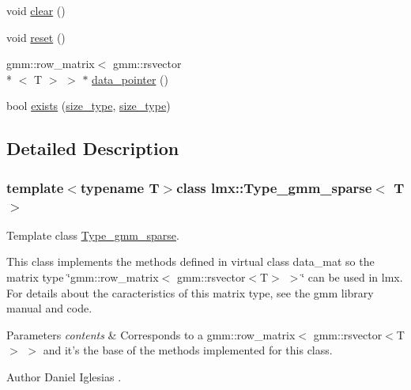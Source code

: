 \begin{DoxyCompactItemize}
\item 
void \hyperlink{classlmx_1_1Type__gmm__sparse_a0816b04a7a46f0ebb7c5deead924eb7e}{clear} ()
\item 
void \hyperlink{classlmx_1_1Type__gmm__sparse_a61568c5bd6eeb065150bcc5fa9543344}{reset} ()
\item 
gmm\-::row\-\_\-matrix$<$ gmm\-::rsvector\\*
$<$ T $>$ $>$ $\ast$ \hyperlink{classlmx_1_1Type__gmm__sparse_a229b2ca7dd50514b47f4847e4a5a3f5d}{data\-\_\-pointer} ()
\item 
bool \hyperlink{classlmx_1_1Type__gmm__sparse_ad5185c1f7082e76afc2470f47462b4df}{exists} (\hyperlink{lmx__mat__data_8h_a49b489a408a211a90e766329c0732d7b}{size\-\_\-type}, \hyperlink{lmx__mat__data_8h_a49b489a408a211a90e766329c0732d7b}{size\-\_\-type})
\end{DoxyCompactItemize}


\subsection{Detailed Description}
\subsubsection*{template$<$typename T$>$class lmx\-::\-Type\-\_\-gmm\-\_\-sparse$<$ T $>$}

Template class \hyperlink{classlmx_1_1Type__gmm__sparse}{Type\-\_\-gmm\-\_\-sparse}. 

This class implements the methods defined in virtual class data\-\_\-mat so the matrix type \char`\"{}gmm\-::row\-\_\-matrix$<$ gmm\-::rsvector$<$\-T$>$ $>$\char`\"{} can be used in lmx. For details about the caracteristics of this matrix type, see the gmm library manual and code.


\begin{DoxyParams}{Parameters}
{\em contents} & Corresponds to a gmm\-::row\-\_\-matrix$<$ gmm\-::rsvector$<$\-T$>$ $>$ and it's the base of the methods implemented for this class.\\
\hline
\end{DoxyParams}
\begin{DoxyAuthor}{Author}
Daniel Iglesias . 
\end{DoxyAuthor}


